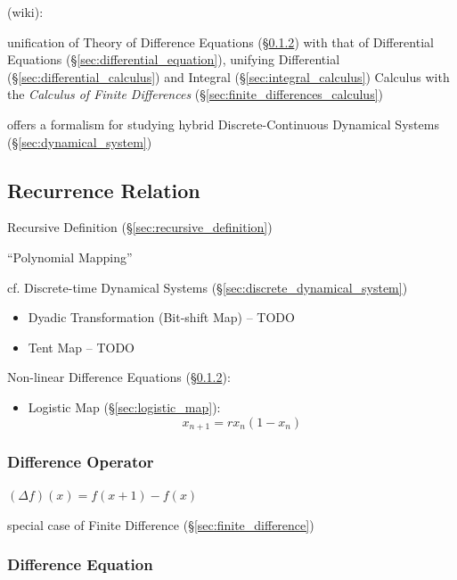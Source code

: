 {(wiki):

unification of Theory of Difference Equations (\S\ref{sec:difference_equation})
with that of Differential Equations (\S\ref{sec:differential_equation}),
unifying Differential (\S\ref{sec:differential_calculus}) and Integral
(\S\ref{sec:integral_calculus}) Calculus with the \emph{Calculus of Finite
  Differences} (\S\ref{sec:finite_differences_calculus})

offers a formalism for studying hybrid Discrete-Continuous Dynamical Systems
(\S\ref{sec:dynamical_system})



\subsection{Recurrence Relation}\label{sec:recurrence_relation}

Recursive Definition (\S\ref{sec:recursive_definition})

``Polynomial Mapping''

\fist cf. Discrete-time Dynamical Systems
(\S\ref{sec:discrete_dynamical_system})

\begin{itemize}
  \item Dyadic Transformation (Bit-shift Map) -- TODO
  \item Tent Map -- TODO
\end{itemize}

Non-linear Difference Equations (\S\ref{sec:difference_equation}):
\begin{itemize}
  \item Logistic Map (\S\ref{sec:logistic_map}):\[
    x_{n+1} = rx_n(1-x_n)
  \]
\end{itemize}



\subsubsection{Difference Operator}\label{sec:difference_operator}

$(\Delta f)(x) = f(x + 1) - f(x)$

special case of Finite Difference (\S\ref{sec:finite_difference})



\subsubsection{Difference Equation}\label{sec:difference_equation}

}
